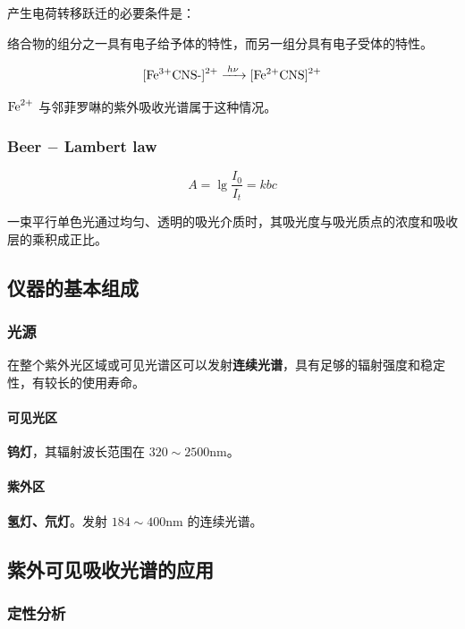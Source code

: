 产生电荷转移跃迁的必要条件是：

络合物的组分之一具有电子给予体的特性，而另一组分具有电子受体的特性。

\begin{equation}
    \ce{{[Fe^{3+}CNS-]}^{2+} ->[$h\nu$] {[Fe^{2+}CNS]}^{2+}}
\end{equation}

$\ce{Fe^{2+}}$ 与邻菲罗啉的紫外吸收光谱属于这种情况。

\subsubsection{Beer $-$ Lambert law}

\begin{equation}
    A = \lg \frac{I_0}{I_t} = kbc
\end{equation}

一束平行单色光通过均匀、透明的吸光介质时，其吸光度与吸光质点的浓度和吸收层的乘积成正比。

\subsection{仪器的基本组成}

\subsubsection{光源}

在整个紫外光区域或可见光谱区可以发射\textbf{连续光谱}，具有足够的辐射强度和稳定
性，有较长的使用寿命。

\paragraph{可见光区} \textbf{钨灯}，其辐射波长范围在 $320 \sim 2500 \mathrm{nm}$。

\paragraph{紫外区} \textbf{氢灯、氘灯}。发射 $184 \sim 400 \mathrm{nm}$ 的连续光谱。

\subsection{紫外可见吸收光谱的应用}

\subsubsection{定性分析}

